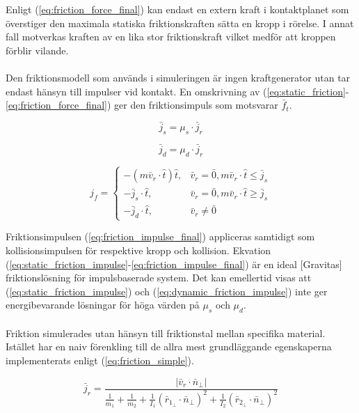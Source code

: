 \documentclass[a4paper,12pt,twopage,swedish]{article}
\begin{document}
Enligt (\ref{eq:friction_force_final}) kan endast en extern kraft i kontaktplanet som överstiger den maximala statiska friktionskraften sätta en kropp i rörelse. I annat fall motverkas kraften av en lika stor friktionskraft vilket medför att kroppen förblir vilande.
\\
\\Den friktionsmodell som används i simuleringen är ingen kraftgenerator utan tar endast hänsyn till impulser vid kontakt. En omskrivning av (\ref{eq:static_friction}-\ref{eq:friction_force_final}) ger den friktionsimpuls som motsvarar $\bar{f}_t$.

\begin{equation}\label{eq:static_friction_impulse}
\bar{j}_s = \mu_s \cdot \bar{j}_r
\end{equation}

\begin{equation}\label{eq:dynamic_friction_impulse}
\bar{j}_d = \mu_d \cdot \bar{j}_r
\end{equation}

\begin{equation}\label{eq:friction_impulse_final}
j_f =\begin{cases}
    -(m\bar{v}_r \cdot \hat{t})\hat{t}, & \bar{v}_r = \bar{0}, m\bar{v}_r \cdot \hat{t} \le \bar{j}_s \\
    -\bar{j}_s \cdot \hat{t}, & \bar{v}_r = \bar{0}, m\bar{v}_r \cdot \hat{t} \ge \bar{j}_s \\
    - \bar{j}_d \cdot \hat{t} , & \bar{v}_r \ne \bar{0}
  \end{cases}
\end{equation}

Friktionsimpulsen (\ref{eq:friction_impulse_final}) appliceras samtidigt som kollisionsimpulsen för respektive kropp och kollision. Ekvation (\ref{eq:static_friction_impulse}-\ref{eq:friction_impulse_final}) är en ideal [Gravitas] friktionslösning för impulsbaserade system. Det kan emellertid visas att (\ref{eq:static_friction_impulse}) och (\ref{eq:dynamic_friction_impulse}) inte ger energibevarande lösningar för höga värden på $\mu_s$ och $\mu_d$.
\\
\\Friktion simulerades utan hänsyn till friktionstal mellan specifika material. Istället har en naiv förenkling till de allra mest grundläggande egenskaperna implementerats enligt (\ref{eq:friction_simple}).

\begin{equation}\label{eq:friction_simple}
\bar{j}_r = \frac{|\bar{v}_r \cdot \bar{n}_{\perp}|}{\frac{1}{m_1}+\frac{1}{m_2}+\frac{1}{I_1}(\bar{r}_{1_{\perp}} \cdot \bar{n}_{\perp})^2+\frac{1}{I_2}(\bar{r}_{2_{\perp}} \cdot \bar{n}_{\perp})^2}
\end{equation}
\end{document}
